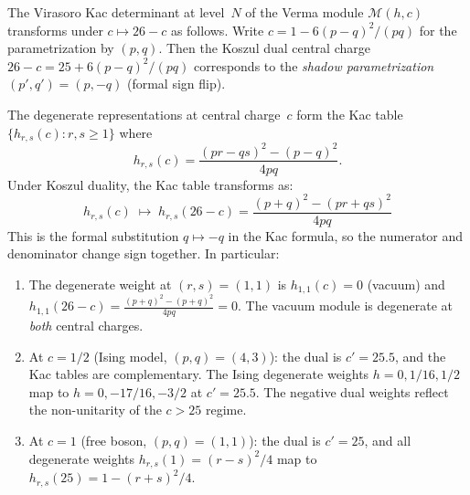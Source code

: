 \begin{proposition}
\label{prop:virasoro-kac-koszul}
The Virasoro Kac determinant at level~$N$ of the Verma module
$\mathcal{M}(h, c)$ transforms under $c \mapsto 26-c$ as follows.
Write $c = 1 - 6(p - q)^2/(pq)$ for the parametrization by
$(p, q)$. Then the Koszul dual central charge $26 - c = 25 + 6(p-q)^2/(pq)$
corresponds to the \emph{shadow parametrization}
$(p', q') = (p, -q)$ \textup{(}formal sign flip\textup{)}.

The degenerate representations at central charge~$c$ form the
Kac table $\{h_{r,s}(c) : r, s \geq 1\}$ where
\begin{equation}\label{eq:kac-hrs}
h_{r,s}(c) = \frac{(pr - qs)^2 - (p - q)^2}{4pq}.
\end{equation}
Under Koszul duality, the Kac table transforms as:
\begin{equation}\label{eq:kac-table-koszul}
h_{r,s}(c) \;\longmapsto\; h_{r,s}(26-c)
= \frac{(p + q)^2 - (pr + qs)^2}{4pq}
\end{equation}
This is the formal substitution $q \mapsto -q$ in the Kac formula,
so the numerator and denominator change sign together. In particular:
\begin{enumerate}[label=\textup{(\roman*)}]
\item The degenerate weight at $(r,s) = (1,1)$ is
 $h_{1,1}(c) = 0$ \textup{(}vacuum\textup{)} and
 $h_{1,1}(26-c) = \frac{(p+q)^2 - (p+q)^2}{4pq} = 0$.
 The vacuum module is degenerate at \emph{both} central charges.

\item At $c = 1/2$ \textup{(}Ising model, $(p,q) = (4,3)$\textup{)}:
 the dual is $c' = 25.5$, and the Kac tables are complementary.
 The Ising degenerate weights $h = 0, 1/16, 1/2$ map to
 $h = 0, -17/16, -3/2$ at $c' = 25.5$.
 The negative dual weights reflect the non-unitarity of the $c > 25$ regime.

\item At $c = 1$ \textup{(}free boson, $(p,q) = (1,1)$\textup{)}:
 the dual is $c' = 25$, and all degenerate weights
 $h_{r,s}(1) = (r-s)^2/4$ map to $h_{r,s}(25) = 1 - (r+s)^2/4$.
\end{enumerate}
\end{proposition}

